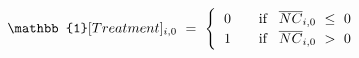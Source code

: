 \begin{equation}
\begin{split}
    \mathbb{1}[Treatment]_{i, 0} \ 
    & = \ 
    \begin{cases}
        \hspace{0.2cm} 0 \hspace{0.7cm} \text{if} \hspace{0.3cm} \overline{NC}_{i, 0} \ \leq \ 0 \\
        \hspace{0.2cm} 1 \hspace{0.7cm} \text{if} \hspace{0.3cm} \overline{NC}_{i, 0} \ > \ 0
    \end{cases}
\end{split}
\label{Eq:Treatment-Status-Determination-Rule}
\end{equation}
